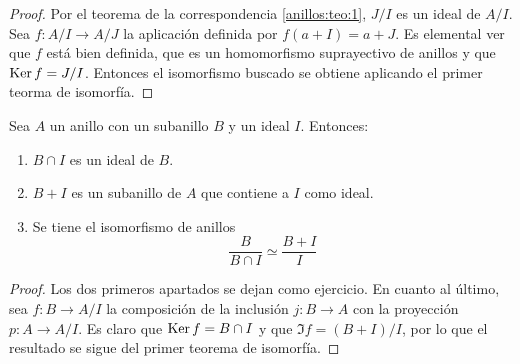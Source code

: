 \begin{proof}
    Por el teorema de la correspondencia \ref{anillos:teo:1}, $J/I$ es un ideal de $A/I$. Sea $f:A/I\rightarrow A/J$ la aplicación definida por $f(a+I)=a+J$. Es elemental ver que $f$ está bien definida, que es un homomorfismo suprayectivo de anillos y que $\operatorname{\rm Ker} f = J/I$. Entonces el isomorfismo buscado se obtiene aplicando el primer teorma de isomorfía.
\end{proof}

\begin{teo} Sea $A$ un anillo con un subanillo $B$ y un ideal $I$. Entonces:
    \begin{enumerate}[label=(\arabic*)]
        \item $B\cap I$ es un ideal de $B$.
        \item $B+I$ es un subanillo de $A$ que contiene a $I$ como ideal.
        \item Se tiene el isomorfismo de anillos
        $$\frac{B}{B\cap I}\simeq \frac{B+I}{I}$$
    \end{enumerate}    
\end{teo}

\begin{proof}
    Los dos primeros apartados se dejan como ejercicio. En cuanto al último, sea $f:B\rightarrow A/I$ la composición de la inclusión $j:B\rightarrow A$ con la proyección $p:A\rightarrow A/I$. Es claro que $\operatorname{\rm Ker} f=B\cap I$ y que $\Im f=(B+I)/I$, por lo que el resultado se sigue del primer teorema de isomorfía.
\end{proof}